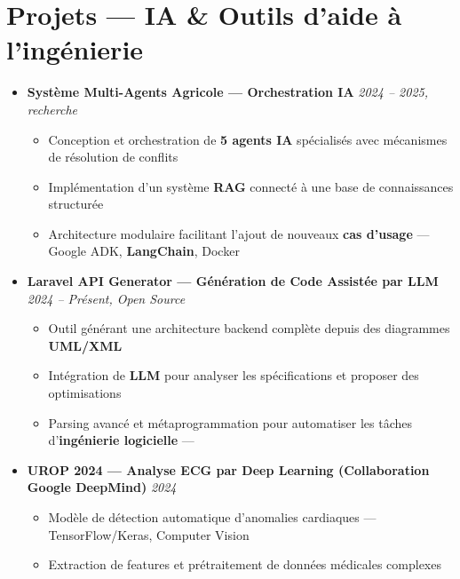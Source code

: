 ﻿\documentclass[a4paper,11pt]{article}
\begin{document}
\section{Projets — IA \& Outils d'aide à l'ingénierie}
\begin{itemize}[leftmargin=*, label={}]

    \item \textbf{Système Multi-Agents Agricole — Orchestration IA} \hfill \textit{2024 -- 2025, recherche}
    \vspace{-2pt}
    \begin{itemize}[leftmargin=0.4cm, nosep, label=\tiny$\bullet$]
        \item \small{Conception et orchestration de \textbf{5 agents IA} spécialisés avec mécanismes de résolution de conflits}
        \item \small{Implémentation d'un système \textbf{RAG} connecté à une base de connaissances structurée}
        \item \small{Architecture modulaire facilitant l'ajout de nouveaux \textbf{cas d'usage} — Google ADK, \textbf{LangChain}, Docker}
    \end{itemize}
    \vspace{4pt}

    \item \textbf{Laravel API Generator — Génération de Code Assistée par LLM} \hfill \textit{2024 -- Présent, Open Source}
    \vspace{-2pt}
    \begin{itemize}[leftmargin=0.4cm, nosep, label=\tiny$\bullet$]
        \item \small{Outil générant une architecture backend complète depuis des diagrammes \textbf{UML/XML}}
        \item \small{Intégration de \textbf{LLM} pour analyser les spécifications et proposer des optimisations}
        \item \small{Parsing avancé et métaprogrammation pour automatiser les tâches d'\textbf{ingénierie logicielle} — \href{https://github.com/Nameless0l/laravel-api-generator}{\faGithub}}
    \end{itemize}
    \vspace{4pt}

    \item \textbf{UROP 2024 — Analyse ECG par Deep Learning (Collaboration Google DeepMind)} \hfill \textit{2024}
    \vspace{-2pt}
    \begin{itemize}[leftmargin=0.4cm, nosep, label=\tiny$\bullet$]
        \item \small{Modèle de détection automatique d'anomalies cardiaques — TensorFlow/Keras, Computer Vision}
        \item \small{Extraction de features et prétraitement de données médicales complexes}
    \end{itemize}

\end{itemize}
\end{document}
